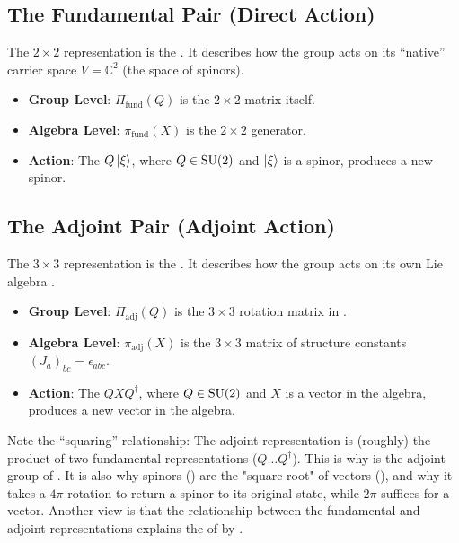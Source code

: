 \subsection{The Fundamental Pair (Direct Action)}
The $2 \times 2$ representation is the . It describes how the group  acts on its ``native'' carrier
space $V = \mathbb{C}^2$ (the space of spinors).
\begin{itemize}[noitemsep]
    \item \textbf{Group Level}: $\Pi_{\text{fund}}(Q)$ is the $2 \times 2$ matrix itself.
    \item \textbf{Algebra Level}: $\pi_{\text{fund}}(X)$ is the $2 \times 2$ generator.
    \item \textbf{Action}: The  $Q \ket{\xi}$, where $Q \in \mathrm{SU}(2)$
        and $\ket{\xi}$ is a spinor, produces a new spinor.
\end{itemize}

\subsection{The Adjoint Pair (Adjoint Action)}
The $3 \times 3$ representation is the .
It describes how the group  acts on its own Lie algebra
.
\begin{itemize}[noitemsep]
    \item \textbf{Group Level}: $\Pi_{\text{adj}}(Q)$ is the $3 \times 3$ rotation matrix in .
    \item \textbf{Algebra Level}: $\pi_{\text{adj}}(X)$ is the $3 \times 3$ matrix of structure 
        constants $(J_a)_{bc} = \epsilon_{abc}$.
    \item \textbf{Action}: The  $Q X Q^\dagger$, where $Q \in \mathrm{SU}(2)$ 
        and $X$ is a vector in the algebra, produces a new vector in the algebra.
\end{itemize}

\begin{remark}
Note the ``squaring'' relationship: The adjoint representation is (roughly) the
product of two fundamental representations ($Q \dots Q^\dagger$). This is why
 is the adjoint group of . It is also why spinors () are the
"square root" of vectors (), and why it takes a $4\pi$ rotation to
return a spinor to its original state, while $2\pi$ suffices for a vector.
Another view is that the relationship between the fundamental and adjoint
representations explains the  of  by .
\end{remark}


